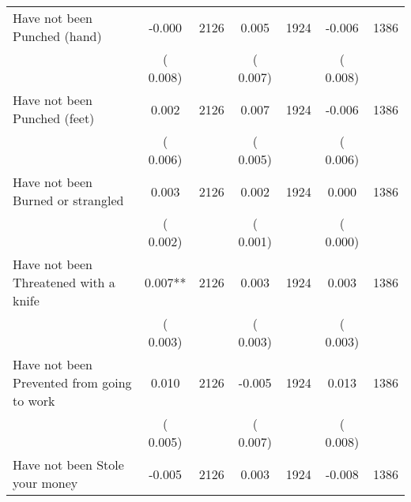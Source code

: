 \begin{tabular}{l*{6}{c}}
Have not been Punched (hand)        &             -0.000      &       2126       &              0.005      &       1924       &             -0.006      &       1386       \\
                       &       (       0.008)            &                               &       (       0.007)            &                               &       (       0.008)            &                               \\
Have not been Punched (feet)        &              0.002      &       2126       &              0.007      &       1924       &             -0.006      &       1386       \\
                       &       (       0.006)            &                               &       (       0.005)            &                               &       (       0.006)            &                               \\
Have not been Burned or strangled        &              0.003      &       2126       &              0.002      &       1924       &              0.000      &       1386       \\
                       &       (       0.002)            &                               &       (       0.001)            &                               &       (       0.000)            &                               \\
Have not been Threatened with a knife        &              0.007**      &       2126       &              0.003      &       1924       &              0.003      &       1386       \\
                       &       (       0.003)            &                               &       (       0.003)            &                               &       (       0.003)            &                               \\
Have not been Prevented from going to work        &              0.010      &       2126       &             -0.005      &       1924       &              0.013      &       1386       \\
                       &       (       0.005)            &                               &       (       0.007)            &                               &       (       0.008)            &                               \\
Have not been Stole your money        &             -0.005      &       2126       &              0.003      &       1924       &             -0.008      &       1386       \\

\end{tabular}
